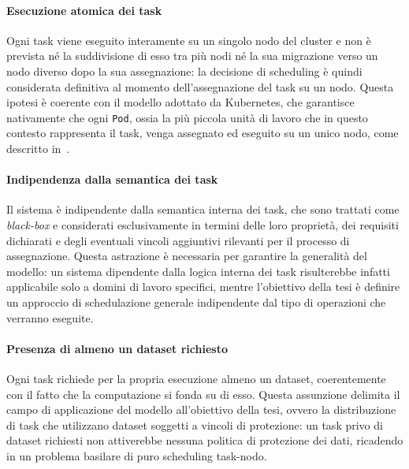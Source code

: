 \paragraph{Esecuzione atomica dei task}
\label{ass:task_atomicita}

Ogni task viene eseguito interamente su un singolo nodo del cluster e non è prevista né la suddivisione di esso tra più nodi né la sua migrazione verso un nodo diverso dopo la sua assegnazione: la decisione di scheduling è quindi considerata definitiva al momento dell'assegnazione del task su un nodo. Questa ipotesi è coerente con il modello adottato da Kubernetes, che garantisce nativamente che ogni \texttt{Pod}, ossia la più piccola unità di lavoro che in questo contesto rappresenta il task, venga assegnato ed eseguito su un unico nodo, come descritto in~\cite{k8s-pods-atomic-node}.

\paragraph{Indipendenza dalla semantica dei task}
\label{ass:task_black_box}

Il sistema è indipendente dalla semantica interna dei task, che sono trattati come \emph{black-box} e considerati esclusivamente in termini delle loro proprietà, dei requisiti dichiarati e degli eventuali vincoli aggiuntivi rilevanti per il processo di assegnazione. Questa astrazione è necessaria per garantire la generalità del modello: un sistema dipendente dalla logica interna dei task risulterebbe infatti applicabile solo a domini di lavoro specifici, mentre l'obiettivo della tesi è definire un approccio di schedulazione generale indipendente dal tipo di operazioni che verranno eseguite.

\paragraph{Presenza di almeno un dataset richiesto}
\label{ass:dataset_minimo}

Ogni task richiede per la propria esecuzione almeno un dataset, coerentemente con il fatto che la computazione si fonda su di esso. Questa assunzione delimita il campo di applicazione del modello all'obiettivo della tesi, ovvero la distribuzione di task che utilizzano dataset soggetti a vincoli di protezione: un task privo di dataset richiesti non attiverebbe nessuna politica di protezione dei dati, ricadendo in un problema basilare di puro scheduling task-nodo.

